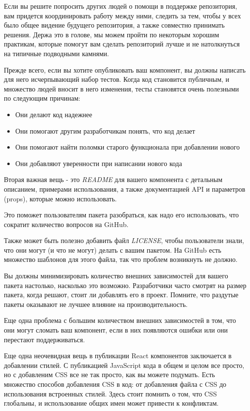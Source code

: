 Если вы решите попросить других людей о помощи в поддержке репозитория, вам придется координировать работу между ними, следить за тем, чтобы у всех было общее видение будущего репозитория, а также совместно принимать решения. Держа это в голове, мы можем пройти по некоторым хорошим практикам, которые помогут вам сделать репозиторий лучше и не натолкнуться на типичные подводными камнями.

Прежде всего, если вы хотите опубликовать ваш компонент, вы должны написать для него исчерпывающий набор тестов. Когда код становится публичным, и множество людей вносит в него изменения, тесты становятся очень полезными по следующим причинам:

\begin{itemize}
  \item Они делают код надежнее
  \item Они помогают другим разработчикам понять, что код делает
  \item Они помогают найти поломки старого функционала при добавлении нового
  \item Они добавляют уверенности при написании нового кода
\end{itemize}

Вторая важная вещь - это \textit{README} для вашего компонента с детальным описанием, примерами использования, а также документацией API и параметров (props), которые можно использовать.

Это поможет пользователям пакета разобраться, как надо его использовать, что сократит количество вопросов на GitHub.	

Также может быть полезно добавить файл \textit{LICENSE}, чтобы пользователи знали, что они могут (и что не могут) делать с вашим пакетом. На GitHub есть множество шаблонов для этого файла, так что проблем возникнуть не должно.

Вы должны минимизировать количество внешних зависимостей для вашего пакета настолько, насколько это возможно. Разработчики часто смотрят на размер пакета, когда решают, стоит ли добавлять его в проект. Помните, что раздутые пакеты оказывают не лучшее влияние на производительность.

Еще одна проблема с большим количеством внешних зависимостей в том, что они могут сломать ваш компонент, если в них появляются ошибки или они перестают поддерживаться.

Еще одна неочевидная вещь в публикации React компонентов заключается в добавлении стилей. С публикацией JavaScript кода в общем и целом все просто, но с добавленим CSS все не так просто, как вы можете подумать. Есть множество способов добавления CSS в код: от добавления файла с CSS до использования встроенных стилей. Здесь стоит помнить о том, что CSS глобальны, и использование общих имен может привести к конфликтам.

